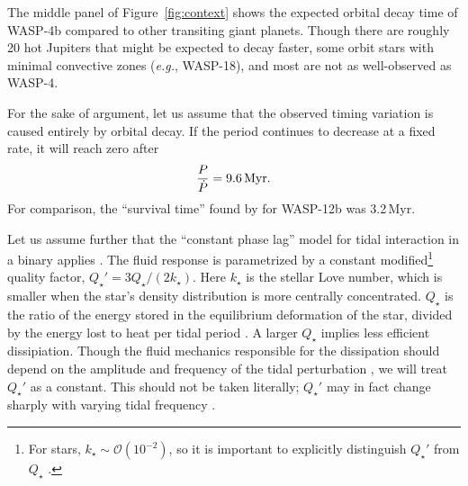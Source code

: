 \documentclass[12pt,twocolumn,tighten]{aastex62}
\begin{document}
The middle panel of Figure~\ref{fig:context} shows the expected
orbital decay time of WASP-4b compared to other transiting giant
planets.  Though there are roughly 20 hot Jupiters that might be
expected to decay faster, some orbit stars with minimal convective
zones ({\it e.g.}, WASP-18), and most are not as well-observed as
WASP-4.

For the sake of argument,
let us assume that the observed timing
variation is caused entirely by orbital decay.  If the period
continues to decrease at a fixed rate, it will reach zero after
\begin{equation}
  \frac{P}{ \dot{P} } = 9.6 \, {\rm Myr}.
\end{equation}
For comparison, the ``survival time'' found by \citet{patra_2017} for
WASP-12b was 3.2\,Myr.

Let us assume further that the ``constant phase lag'' model for tidal
interaction in a binary applies \citep{zahn_tidal_1977}.  The fluid
response is parametrized by a constant modified\footnote{For stars,
$k_\star \sim \mathcal{O}(10^{-2})$, so it is important to explicitly
distinguish $Q_\star'$ from $Q_\star$ \citep[{\it
e.g.},][]{schwarzschild_structure_1958}.} quality factor, $Q_\star' =
3 Q_\star / (2k_\star)$.  Here $k_\star$ is the stellar Love number,
which is smaller when the star's density distribution is more
centrally concentrated. $Q_\star$ is the ratio of the energy stored in
the equilibrium deformation of the star, divided by the energy
lost to heat per tidal period \citep[{\it e.g.},][]{goldreich_q_1966}.
A larger $Q_\star$ implies less efficient dissipiation.  Though the
fluid mechanics responsible for the dissipation should depend on the
amplitude and frequency of the tidal perturbation
\citep[][Section~3.3]{ogilvie_tidal_2014}, we will treat $Q_\star'$ as
a constant.  This should not be taken literally; $Q_\star'$ may in
fact change sharply with varying tidal frequency
\citep{penev_empirical_2018}.
\end{document}
